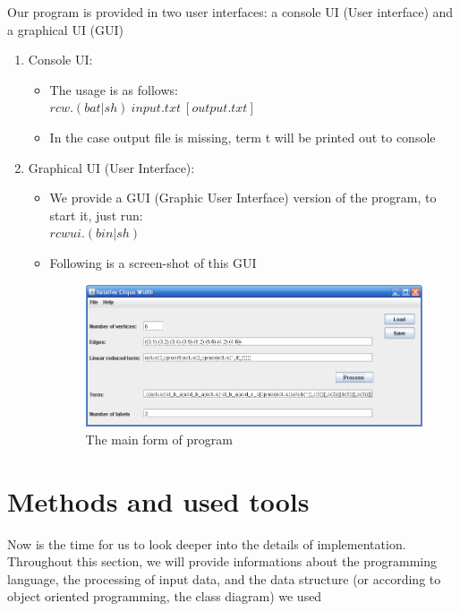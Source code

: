 \documentclass[a4paper, 12pt]{article}
\begin{document}
Our program is provided in two user interfaces: a console UI (User interface) and a graphical UI (GUI)
\begin{enumerate}
\item Console UI:
\begin{itemize}
\item The usage is as follows:\\
{$rcw.(bat|sh)\ input.txt\ [output.txt]$}

\item In the case output file is missing, term t will be printed out to
console 
\end{itemize}

\item Graphical UI (User Interface):
\begin{itemize}
\item We provide a GUI (Graphic User Interface) version of the program, to start it, just run:\\
{$rcwui.(bin|sh)$}
\item Following is a screen-shot of this GUI\\

\begin{figure}[H]
\begin{centering}
\includegraphics [width=15cm]{image/MainUi.PNG}
\caption{The main form of program}
\par\end{centering}

\end{figure}

\end{itemize}
\end{enumerate}

\section {Methods and used tools}
Now is the time for us to look deeper into the details of implementation. Throughout this section, we will provide informations about the programming language, the processing of input data, and the data structure (or according to object oriented programming, the class diagram) we used
\end{document}
